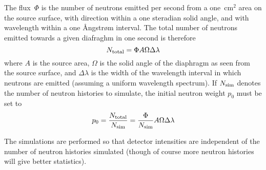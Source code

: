 The flux~$\Phi$ is the number of neutrons emitted per second from a
one~cm$^2$ area on the source surface, with direction within a one
steradian solid angle, and with wavelength within a one {\AA}ngstr{\o}m
interval. The total number of neutrons emitted towards a given diafraghm
in one second is therefore
$$ N_{\rm total} = \Phi A \Omega \Delta\lambda $$
where $A$ is the source area, $\Omega$ is the solid angle of the
diaphragm as seen from the source surface, and $\Delta\lambda$ is the
width of the wavelength interval in which neutrons are emitted (assuming
a uniform wavelength spectrum). If $N_{\rm sim}$ denotes the number of
neutron histories to simulate, the initial neutron weight $p_0$ must be set to
$$ p_0 = \frac{N_{\rm total}}{N_{\rm sim}} =
    \frac{\Phi}{N_{\rm sim}} A \Omega \Delta\lambda $$

The simulations are performed so that detector intensities
are independent of the number of neutron histories simulated
(though of course more neutron histories will give better statistics).

\newpage


%

\newpage


%

%

%

